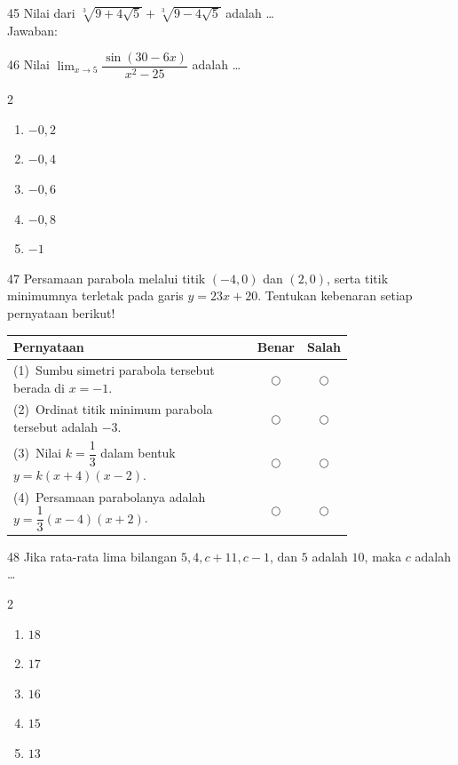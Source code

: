 \documentclass[11pt]{article}
\newenvironment{pilB}{%
  \par\smallskip\begin{multicols}{2}
  \begin{enumerate}[label=(\Alph*),leftmargin=*,itemsep=1pt,topsep=3pt]}%
  {\end{enumerate}\end{multicols}}
\begin{document}
\begin{soal}{45}
Nilai dari $\sqrt[3]{9+4\sqrt{5}}+\sqrt[3]{9-4\sqrt{5}}$ adalah \ldots\\[0.4em]
Jawaban:\enspace\underline{\hspace{4cm}}
\end{soal}

\begin{soal}{46}
Nilai $\displaystyle\lim_{x\to5}\dfrac{\sin(30-6x)}{x^2-25}$ adalah \ldots
\begin{pilB}
  \item $-0{,}2$ \item $-0{,}4$ \item $-0{,}6$ \item $-0{,}8$ \item $-1$
\end{pilB}
\end{soal}

\begin{soal}{47}
Persamaan parabola melalui titik $(-4,0)$ dan $(2,0)$, serta titik
minimumnya terletak pada garis $y=23x+20$.
Tentukan kebenaran setiap pernyataan berikut!

\par\smallskip
{\renewcommand{\arraystretch}{1.4}%
\begin{tabular}{@{}p{0.76\linewidth}cc@{}}
\hline
\textbf{Pernyataan} & \textbf{Benar} & \textbf{Salah}\\
\hline
(1)~Sumbu simetri parabola tersebut berada di $x=-1$.
  & $\bigcirc$ & $\bigcirc$\\
(2)~Ordinat titik minimum parabola tersebut adalah $-3$.
  & $\bigcirc$ & $\bigcirc$\\
(3)~Nilai $k=\dfrac{1}{3}$ dalam bentuk $y=k(x+4)(x-2)$.
  & $\bigcirc$ & $\bigcirc$\\
(4)~Persamaan parabolanya adalah $y=\dfrac{1}{3}(x-4)(x+2)$.
  & $\bigcirc$ & $\bigcirc$\\
\hline
\end{tabular}}
\end{soal}

\begin{soal}{48}
Jika rata-rata lima bilangan $5,4,c+11,c-1$, dan $5$ adalah $10$,
maka $c$ adalah \ldots
\begin{pilB}
  \item $18$ \item $17$ \item $16$ \item $15$ \item $13$
\end{pilB}
\end{soal}
\end{document}
